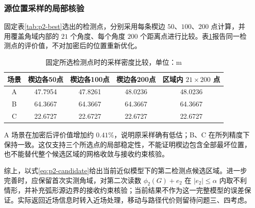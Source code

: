 \subsubsection{源位置采样的局部核验}

固定表\ref{tab:p2-best}选出的检测点，分别采用每条楔边 $50$、$100$、$200$ 点计算，并用覆盖角域内部的 $21$ 个角度、每个角度 $200$ 个距离点进行比较。表\ref{tab:p2-sampling}报告同一检测点的评价值，不对加密后的位置重新优化。
\begin{table}[H]
\centering
\caption{固定所选检测点时的采样密度比较，单位：m}\label{tab:p2-sampling}
\begin{tabular}{ccccc}
\toprule
场景 & 楔边各50点 & 楔边各100点 & 楔边各200点 & 区域内 $21\times200$ 点\\
\midrule
A & 47.7954 & 47.8261 & 48.0236 & 48.0236\\
B & 64.3667 & 64.3667 & 64.3667 & 64.3667\\
C & 22.6727 & 22.6727 & 22.6727 & 22.6727\\
\bottomrule
\end{tabular}
\end{table}

A 场景在加密后评价值增加约 $0.41\%$，说明原采样确有低估；B、C 在所列精度下保持一致。这仅支持三个所选点的局部稳定性，不能证明楔边包含全部最坏位置，也不能替代整个候选区域的网格收敛与接收约束核验。

综上，以式\eqref{eq:p2-candidate}给出当前近似模型下的第二检测点候选区域。进一步完善时，应保留首次实测角域，对第二次读数 $\phi_2(G)+e_2$ 在 $|e_2|\le\alpha$ 内取不利情形，并补充弧形源边界的接收约束核验；当前结果不作为这一完整模型的误差保证。实际返回近场信息时转入近场处理，移动与路径代价则留待问题三、四考虑。
